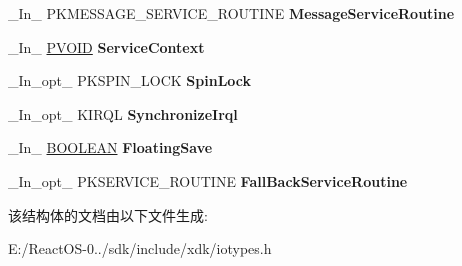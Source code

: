 \begin{DoxyCompactItemize}
\begin{tabbing}
\end{tabbing}\item 
\mbox{\label{struct___i_o___c_o_n_n_e_c_t___i_n_t_e_r_r_u_p_t___m_e_s_s_a_g_e___b_a_s_e_d___p_a_r_a_m_e_t_e_r_s_a38038acc0ab9fb2b5bcd91146567aca1}} 
\+\_\+\+In\+\_\+ P\+K\+M\+E\+S\+S\+A\+G\+E\+\_\+\+S\+E\+R\+V\+I\+C\+E\+\_\+\+R\+O\+U\+T\+I\+NE {\bfseries Message\+Service\+Routine}
\item 
\mbox{\label{struct___i_o___c_o_n_n_e_c_t___i_n_t_e_r_r_u_p_t___m_e_s_s_a_g_e___b_a_s_e_d___p_a_r_a_m_e_t_e_r_s_a14c6daf9ac6272e28efd9c6017ce5ae4}} 
\+\_\+\+In\+\_\+ \hyperlink{interfacevoid}{P\+V\+O\+ID} {\bfseries Service\+Context}
\item 
\mbox{\label{struct___i_o___c_o_n_n_e_c_t___i_n_t_e_r_r_u_p_t___m_e_s_s_a_g_e___b_a_s_e_d___p_a_r_a_m_e_t_e_r_s_a2b16f08521b7a75cf0f9d84f98e5c392}} 
\+\_\+\+In\+\_\+opt\+\_\+ P\+K\+S\+P\+I\+N\+\_\+\+L\+O\+CK {\bfseries Spin\+Lock}
\item 
\mbox{\label{struct___i_o___c_o_n_n_e_c_t___i_n_t_e_r_r_u_p_t___m_e_s_s_a_g_e___b_a_s_e_d___p_a_r_a_m_e_t_e_r_s_a6605c1dfe46156c17eac09d44e3934ea}} 
\+\_\+\+In\+\_\+opt\+\_\+ K\+I\+R\+QL {\bfseries Synchronize\+Irql}
\item 
\mbox{\label{struct___i_o___c_o_n_n_e_c_t___i_n_t_e_r_r_u_p_t___m_e_s_s_a_g_e___b_a_s_e_d___p_a_r_a_m_e_t_e_r_s_a81986292ab9f49aefb9a0e223ab20faf}} 
\+\_\+\+In\+\_\+ \hyperlink{_processor_bind_8h_a112e3146cb38b6ee95e64d85842e380a}{B\+O\+O\+L\+E\+AN} {\bfseries Floating\+Save}
\item 
\mbox{\label{struct___i_o___c_o_n_n_e_c_t___i_n_t_e_r_r_u_p_t___m_e_s_s_a_g_e___b_a_s_e_d___p_a_r_a_m_e_t_e_r_s_a960001624f22d245267ed4df2c07fdc1}} 
\+\_\+\+In\+\_\+opt\+\_\+ P\+K\+S\+E\+R\+V\+I\+C\+E\+\_\+\+R\+O\+U\+T\+I\+NE {\bfseries Fall\+Back\+Service\+Routine}
\end{DoxyCompactItemize}


该结构体的文档由以下文件生成\+:\begin{DoxyCompactItemize}
\item 
E\+:/\+React\+O\+S-\/0../sdk/include/xdk/iotypes.\+h\end{DoxyCompactItemize}
